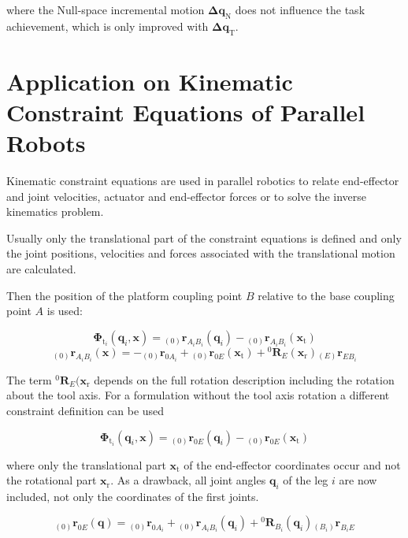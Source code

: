 \documentclass[twocolumn,10pt]{IFTOMM}
\newcommand{\bm}[1]{\boldsymbol{#1}}
\newcommand{\ortvek}[4]{{ }_{(#1)}{\boldsymbol{#2}}^{#3}_{#4} }
\newcommand{\rotmat}[2]{{{ }^{#1}\boldsymbol{R}}_{#2}}
\begin{document}
where the Null-space incremental motion $\bm{\Delta}\bm{q}_{\mathrm{N}}$ does not influence the task achievement, which is only improved with $\bm{\Delta}\bm{q}_{\mathrm{T}}$.

\section{Application on Kinematic Constraint Equations of Parallel Robots}
\label{sec:ParRobKinConstr}

Kinematic constraint equations are used in parallel robotics to relate end-effector and joint velocities, actuator and end-effector forces or to solve the inverse kinematics problem.

Usually only the translational part of the constraint equations is defined and only the joint positions, velocities and forces associated with the translational motion are calculated. %

Then the position of the platform coupling point $B$ relative to the base coupling point $A$ is used:

\begin{equation}
\bm{\Phi}_{\mathrm{t}_i}(\bm{q}_i,\bm{x}) = \ortvek{0}{r}{}{A_iB_i}(\bm{q}_i) - \ortvek{0}{r}{}{A_iB_i}(\bm{x}_{\mathrm{t}})
\end{equation}
\begin{equation}
\ortvek{0}{r}{}{A_iB_i}(\bm{x}) = 
- \ortvek{0}{r}{}{0A_i}
+ \ortvek{0}{r}{}{0E}(\bm{x}_{\mathrm{t}}) + \rotmat{0}{E}(\bm{x}_{\mathrm{r}}) \ortvek{E}{r}{}{EB_i}
\end{equation}

The term $\rotmat{0}{E}(\bm{x}_{\mathrm{r}}$ depends on the full rotation description including the rotation about the tool axis.
For a formulation without the tool axis rotation a different constraint definition can be used

\begin{equation}
\bm{\Phi}_{\mathrm{t}_i}(\bm{q}_i,\bm{x}) = 
\ortvek{0}{r}{}{0E}(\bm{q}_i) - \ortvek{0}{r}{}{0E}(\bm{x}_{\mathrm{t}})
\end{equation}

where only the translational part $\bm{x}_{\mathrm{t}}$ of the end-effector coordinates occur and not the rotational part $\bm{x}_{\mathrm{r}}$.
As a drawback, all joint angles $\bm{q}_i$ of the leg $i$ are now included, not only the coordinates of the first joints.

\begin{equation}
\ortvek{0}{r}{}{0E}(\bm{q}) = 
\ortvek{0}{r}{}{0A_i}
+ \ortvek{0}{r}{}{A_iB_i}(\bm{q}_i) + \rotmat{0}{B_i}(\bm{q}_i) \ortvek{B_i}{r}{}{B_iE}
\end{equation}
\end{document}

